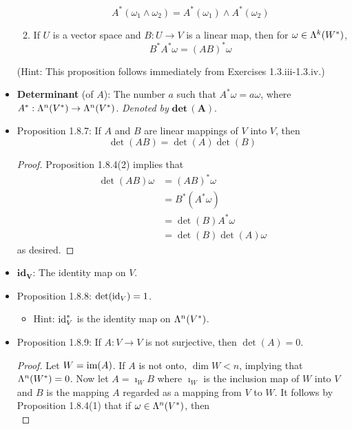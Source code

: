 \documentclass[../notes.tex]{subfiles}
\begin{document}
\begin{itemize}
\begin{enumerate}
\begin{equation*}
            A^*(\omega_1\wedge\omega_2) = A^*(\omega_1)\wedge A^*(\omega_2)
        \end{equation*}
        \item If $U$ is a vector space and $B:U\to V$ is a linear map, then for $\omega\in\lam[k]{W^*}$,
        \begin{equation*}
            B^*A^*\omega = (AB)^*\omega
        \end{equation*}
    \end{enumerate}
    (Hint: This proposition follows immediately from Exercises 1.3.iii-1.3.iv.)
    \item \textbf{Determinant} (of $A$): The number $a$ such that $A^*\omega=a\omega$, where $A^*:\lam[n]{V^*}\to\lam[n]{V^*}$. \emph{Denoted by} $\textbf{det}\,\bm{(A)}$.
    \item Proposition 1.8.7: If $A$ and $B$ are linear mappings of $V$ into $V$, then
    \begin{equation*}
        \det(AB) = \det(A)\det(B)
    \end{equation*}
    \begin{proof}
        Proposition 1.8.4(2) implies that
        \begin{align*}
            \det(AB)\omega &= (AB)^*\omega\\
            &= B^*(A^*\omega)\\
            &= \det(B)A^*\omega\\
            &= \det(B)\det(A)\omega
        \end{align*}
        as desired.
    \end{proof}
    \item $\textbf{id}_{\bm{V}}$: The identity map on $V$.
    \item Proposition 1.8.8: $\det(\id_V)=1$.
    \begin{itemize}
        \item Hint: $\id_V^*$ is the identity map on $\lam[n]{V^*}$.
    \end{itemize}
    \item Proposition 1.8.9: If $A:V\to V$ is not surjective, then $\det(A)=0$.
    \begin{proof}
        Let $W=\im(A)$. If $A$ is not onto, $\dim W<n$, implying that $\lam[n]{W^*}=0$. Now let $A=\imath_WB$ where $\imath_W$ is the inclusion map of $W$ into $V$ and $B$ is the mapping $A$ regarded as a mapping from $V$ to $W$. It follows by Proposition 1.8.4(1) that if $\omega\in\lam[n]{V^*}$, then
        \begin{equation*}

\end{equation*}
\end{proof}
\end{itemize}
\end{document}

